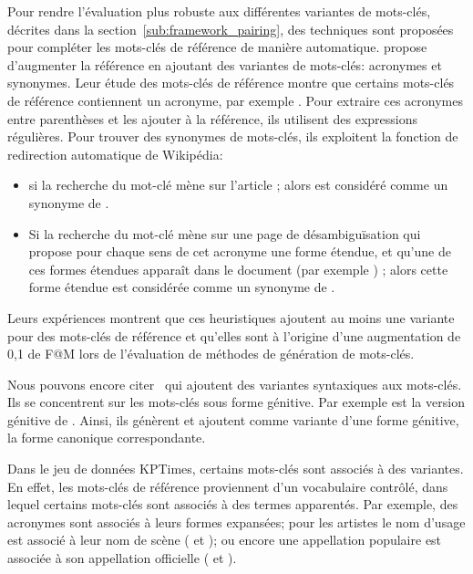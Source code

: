 Pour rendre l'évaluation plus robuste aux différentes variantes de mots-clés, décrites dans la section~\ref{sub:framework_pairing}, des techniques sont proposées pour compléter les mots-clés de référence de manière automatique.
%
\citet{chan_neural_2019} propose d'augmenter la référence en ajoutant des variantes de mots-clés: acronymes et synonymes.
Leur étude des mots-clés de référence montre que certains mots-clés de référence contiennent un acronyme, par exemple . Pour extraire ces acronymes entre parenthèses et les ajouter à la référence, ils utilisent des expressions régulières.
Pour trouver des synonymes de mots-clés, ils exploitent la fonction de redirection automatique de Wikipédia:
\begin{itemize}
    \item si la recherche du mot-clé  mène sur l'article ; alors  est considéré comme un synonyme de .
    \item Si la recherche du mot-clé  mène sur une page de désambiguïsation qui propose pour chaque sens de cet acronyme une forme étendue, et qu'une de ces formes étendues apparaît dans le document (par exemple  ) ; alors cette forme étendue est considérée comme un synonyme de .
\end{itemize}
Leurs expériences montrent que ces heuristiques ajoutent au moins une variante pour  des mots-clés de référence et qu'elles sont à l'origine d'une augmentation de 0,1 de F@M lors de l'évaluation de méthodes de génération de mots-clés.

Nous pouvons encore citer~\citet{kim_semeval-2010_2010} qui ajoutent des variantes syntaxiques aux mots-clés.
Ils se concentrent sur les mots-clés sous forme génitive. Par exemple  est la version génitive de .
Ainsi, ils génèrent et ajoutent comme variante d'une forme génitive, la forme canonique correspondante.

Dans le jeu de données KPTimes, certains mots-clés sont associés à des variantes.
En effet, les mots-clés de référence proviennent d'un vocabulaire contrôlé, dans lequel certains mots-clés sont associés à des termes apparentés.
Par exemple, des acronymes sont associés à leurs formes expansées; pour les artistes le nom d'usage est associé à leur nom de scène ( et ); ou encore une appellation populaire est associée à son appellation officielle ( et ).

